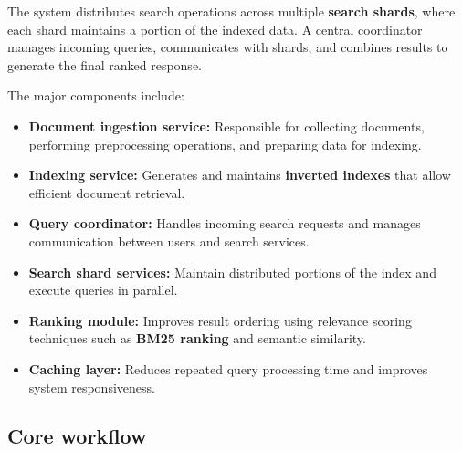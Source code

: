 \documentclass[11pt]{article}
\begin{document}
The system distributes search operations across multiple \textbf{search shards}, where each shard maintains a portion of the indexed data. A central coordinator manages incoming queries, communicates with shards, and combines results to generate the final ranked response.

The major components include:

\begin{itemize}

\item \textbf{Document ingestion service:} Responsible for collecting documents, performing preprocessing operations, and preparing data for indexing.

\item \textbf{Indexing service:} Generates and maintains \textbf{inverted indexes} that allow efficient document retrieval.

\item \textbf{Query coordinator:} Handles incoming search requests and manages communication between users and search services.

\item \textbf{Search shard services:} Maintain distributed portions of the index and execute queries in parallel.

\item \textbf{Ranking module:} Improves result ordering using relevance scoring techniques such as \textbf{BM25 ranking} and semantic similarity.

\item \textbf{Caching layer:} Reduces repeated query processing time and improves system responsiveness.

\end{itemize}


\subsection{Core workflow}
\end{document}
